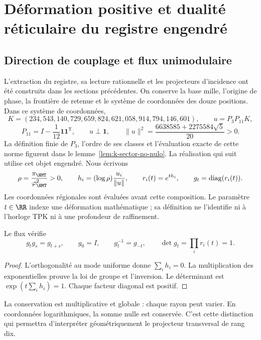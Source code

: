 \section{Déformation positive et dualité réticulaire du registre engendré}
\label{rec:positiva}

\subsection{Direction de couplage et flux unimodulaire}

L’extraction du registre, sa lecture rationnelle et les projecteurs d’incidence ont été construits dans les sections précédentes. On conserve la base mille, l’origine de phase, la frontière de retenue et le système de coordonnées des douze positions. Dans ce système de coordonnées,
\[
 K=(234,543,140,729,659,824,621,058,914,794,146,601),
 \qquad u=P_3P_{11}K,
\]
\[
 P_{11}=I-\frac1{12}\mathbf1\mathbf1^{\mathsf T},\qquad
 u\perp\mathbf1,\qquad
 \|u\|^2=\frac{6638585+2275584\sqrt5}{20}>0.
\]
La définition finie de \(P_3\), l’ordre de ses classes et l’évaluation exacte de cette norme figurent dans le lemme~\ref{lem:k-sector-no-nulo}. La réalisation qui suit utilise cet objet engendré. Nous écrivons
\begin{equation}
 \rho=\frac{\pi_{\HMT}}{\varphi_{\HMT}^2}>0,\qquad
 h_i=(\log\rho)\frac{u_i}{\|u\|},\qquad
 r_i(t)=e^{th_i},\qquad g_t=\operatorname{diag}(r_i(t)).
 \label{rec:eq:flujo}
\end{equation}
Les coordonnées régionales sont évaluées avant cette composition. Le paramètre \(t\in\RR\) indexe une déformation mathématique ; sa définition ne l’identifie ni à l’horloge TPK ni à une profondeur de raffinement.


\begin{proposition}
\label{rec:prop:flujo}
Le flux vérifie
\[
 g_tg_s=g_{t+s},\qquad g_0=I,\qquad g_t^{-1}=g_{-t},\qquad
 \det g_t=\prod_i r_i(t)=1.
\]
\end{proposition}
\begin{proof}
L’orthogonalité au mode uniforme donne \(\sum_i h_i=0\). La multiplication des exponentielles prouve la loi de groupe et l’inversion. Le déterminant est \(\exp(t\sum_i h_i)=1\). Chaque facteur diagonal est positif.
\end{proof}

La conservation est multiplicative et globale : chaque rayon peut varier. En coordonnées logarithmiques, la somme nulle est conservée. C'est cette distinction qui permettra d'interpréter géométriquement le projecteur transversal de rang dix.

